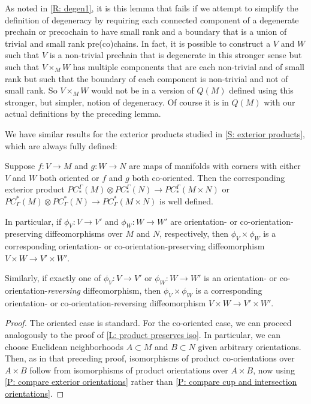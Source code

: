\begin{remark}\label{R: degen2}
	As noted in \cref{R: degen1}, it is this lemma that fails if we attempt to simplify the definition of degeneracy by requiring each connected component of a degenerate prechain or precochain to have small rank and a boundary that is a union of trivial and small rank pre(co)chains.
	In fact, it is possible to construct a $V$ and $W$ such that $V$ is a non-trivial prechain that is degenerate in this stronger sense but such that $V \times_M W$ has multiple components that are each non-trivial and of small rank but such that the boundary of each component is non-trivial and not of small rank.
	So $V \times_M W$ would not be in a version of $Q(M)$ defined using this stronger, but simpler, notion of degeneracy.
	Of course it is in $Q(M)$ with our actual definitions by the preceding lemma.
\end{remark}

We have similar results for the exterior products studied in \cref{S: exterior products}, which are always fully defined:


\begin{lemma}\label{L: ext product preserves iso}
	Suppose $f \colon V \to M$ and $g \colon W \to N$ are maps of manifolds with corners with either $V$ and $W$ both oriented or $f$ and $g$ both co-oriented.
	Then the corresponding exterior product $PC_*^\Gamma(M) \otimes PC_*^\Gamma(N) \to PC_*^\Gamma(M \times N)$ or $PC^*_\Gamma(M) \otimes PC^*_\Gamma(N) \to PC^*_\Gamma(M \times N)$ is well defined.

	In particular, if $\phi_V \colon V \to V'$ and $\phi_W \colon W \to W'$ are orientation- or co-orientation-preserving diffeomorphisms over $M$ and $N$, respectively, then $\phi_V \times \phi_W$ is a corresponding orientation- or co-orientation-preserving diffeomorphism $V \times W \to V' \times W'$.

	Similarly, if exactly one of $\phi_V \colon V \to V'$ or $\phi_W \colon W \to W'$ is an orientation- or co-orientation-\textit{reversing} diffeomorphism, then $\phi_V \times \phi_W$ is a corresponding orientation- or co-orientation-reversing diffeomorphism $V \times W \to V' \times W'$.
\end{lemma}
\begin{proof}
	The oriented case is standard.
	For the co-oriented case, we can proceed analogously to the proof of \cref{L: product preserves iso}.
	In particular, we can choose Euclidean neighborhoods $A \subset M$ and $B \subset N$ given arbitrary orientations.
	Then, as in that preceding proof, isomorphisms of product co-orientations over $A \times B$ follow from isomorphisms of product orientations over $A \times B$, now using \cref{P: compare exterior orientations} rather than \cref{P: compare cup and intersection orientations}.
\end{proof}


